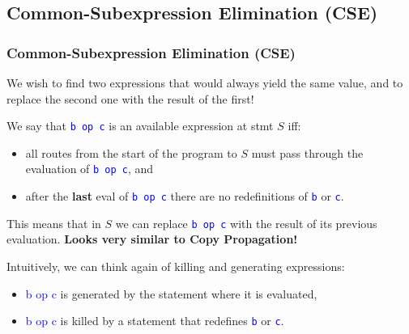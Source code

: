 \documentclass{beamer}
\newcommand{\blue}[1]{\textcolor{Blue}{{#1}}}
\renewcommand{\emph}[1]{\textcolor{structure}{#1}}
\newcommand{\emp}[1]{\textcolor{DikuRed}{ #1}}
\begin{document}
\subsection{Common-Subexpression Elimination (CSE)}


\begin{frame}[fragile,t]
    \frametitle{Common-Subexpression Elimination (CSE)}

\emp{We wish to find two expressions that would always yield the same
        value, and to replace the second one with the result of the first!}

\bigskip

We say that \blue{\tt b op c} is an available expression at stmt $S$ iff:\smallskip
\begin{itemize}
    \item all routes from the start of the program to $S$ must pass through
            the evaluation of \blue{\tt b op c}, and\smallskip

    \item after the \emp{\bf last} eval of \blue{\tt b op c} there are no 
            redefinitions of \blue{\tt b} or \blue{\tt c}.
\end{itemize}

\pause
\bigskip

\emph{This means that in $S$ we can replace \blue{\tt b op c} with the result 
of its previous evaluation. {\bf Looks very similar to Copy Propagation!}}

\bigskip

Intuitively, we can think again of killing and generating expressions:\smallskip

\begin{itemize}
    \item \blue{b op c} is generated by the statement where it is evaluated,\smallskip

    \item \blue{b op c} is killed by a statement that redefines \blue{\tt b} or \blue{\tt c}.
\end{itemize}

\end{frame}
\end{document}
